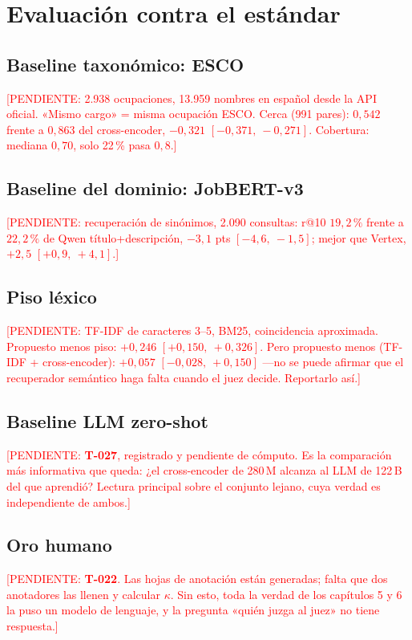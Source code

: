 \documentclass[12pt,a4paper,oneside]{report}
\newcommand{\pend}[1]{\textcolor{red}{\small[PENDIENTE: #1]}}
\newcommand{\tref}[1]{\textbf{T-#1}}
\begin{document}
\chapter{Evaluación contra el estándar}
\label{cap:estandar}

\section{Baseline taxonómico: ESCO}
\pend{2.938 ocupaciones, 13.959 nombres en español desde la API oficial. «Mismo cargo» =
misma ocupación ESCO. Cerca (991 pares): $0{,}542$ frente a $0{,}863$ del cross-encoder,
$-0{,}321$ $[-0{,}371,\ -0{,}271]$. Cobertura: mediana $0{,}70$, solo 22\,\% pasa $0{,}8$.}

\section{Baseline del dominio: JobBERT-v3}
\pend{recuperación de sinónimos, 2.090 consultas: r@10 $19{,}2\,\%$ frente a $22{,}2\,\%$
de Qwen título+descripción, $-3{,}1$ pts $[-4{,}6,\ -1{,}5]$; mejor que Vertex,
$+2{,}5$ $[+0{,}9,\ +4{,}1]$.}

\section{Piso léxico}
\pend{TF-IDF de caracteres 3--5, BM25, coincidencia aproximada. Propuesto menos piso:
$+0{,}246$ $[+0{,}150,\ +0{,}326]$. Pero propuesto menos (TF-IDF + cross-encoder):
$+0{,}057$ $[-0{,}028,\ +0{,}150]$ ---no se puede afirmar que el recuperador semántico
haga falta cuando el juez decide. Reportarlo así.}

\section{Baseline LLM zero-shot}
\pend{\tref{027}, registrado y pendiente de cómputo. Es la comparación más informativa que
queda: ¿el cross-encoder de 280\,M alcanza al LLM de 122\,B del que aprendió? Lectura
principal sobre el conjunto lejano, cuya verdad es independiente de ambos.}

\section{Oro humano}
\pend{\tref{022}. Las hojas de anotación están generadas; falta que dos anotadores las
llenen y calcular $\kappa$. Sin esto, toda la verdad de los capítulos 5 y 6 la puso un
modelo de lenguaje, y la pregunta «quién juzga al juez» no tiene respuesta.}
\end{document}
